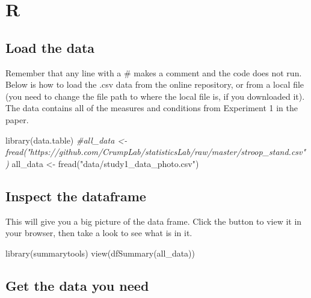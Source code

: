 \documentclass[
]{book}
\newenvironment{Shaded}{\begin{snugshade}}{\end{snugshade}}
\newcommand{\CommentTok}[1]{\textcolor[rgb]{0.56,0.35,0.01}{\textit{#1}}}
\newcommand{\FunctionTok}[1]{\textcolor[rgb]{0.00,0.00,0.00}{#1}}
\newcommand{\NormalTok}[1]{#1}
\newcommand{\OtherTok}[1]{\textcolor[rgb]{0.56,0.35,0.01}{#1}}
\newcommand{\StringTok}[1]{\textcolor[rgb]{0.31,0.60,0.02}{#1}}
\begin{document}
\hypertarget{r-11}{%
\section{R}\label{r-11}}

\hypertarget{load-the-data-5}{%
\subsection{Load the data}\label{load-the-data-5}}

Remember that any line with a \# makes a comment and the code does not run. Below is how to load the .csv data from the online repository, or from a local file (you need to change the file path to where the local file is, if you downloaded it). The data contains all of the measures and conditions from Experiment 1 in the paper.

\begin{Shaded}
\begin{Highlighting}[]
\FunctionTok{library}\NormalTok{(data.table)}
\CommentTok{\#all\_data \textless{}{-} fread("https://github.com/CrumpLab/statisticsLab/raw/master/stroop\_stand.csv")}
\NormalTok{all\_data }\OtherTok{\textless{}{-}} \FunctionTok{fread}\NormalTok{(}\StringTok{"data/study1\_data\_photo.csv"}\NormalTok{)}
\end{Highlighting}
\end{Shaded}

\hypertarget{inspect-the-dataframe-3}{%
\subsection{Inspect the dataframe}\label{inspect-the-dataframe-3}}

This will give you a big picture of the data frame. Click the button to view it in your browser, then take a look to see what is in it.

\begin{Shaded}
\begin{Highlighting}[]
\FunctionTok{library}\NormalTok{(summarytools)}
\FunctionTok{view}\NormalTok{(}\FunctionTok{dfSummary}\NormalTok{(all\_data))}
\end{Highlighting}
\end{Shaded}

\hypertarget{get-the-data-you-need-3}{%
\subsection{Get the data you need}\label{get-the-data-you-need-3}}
\end{document}
